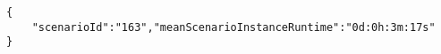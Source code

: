 		\begin{flushleft}
			\begin{lstlisting}
{
    "scenarioId":"163","meanScenarioInstanceRuntime":"0d:0h:3m:17s"
}

			\end{lstlisting}
		\end{flushleft}
